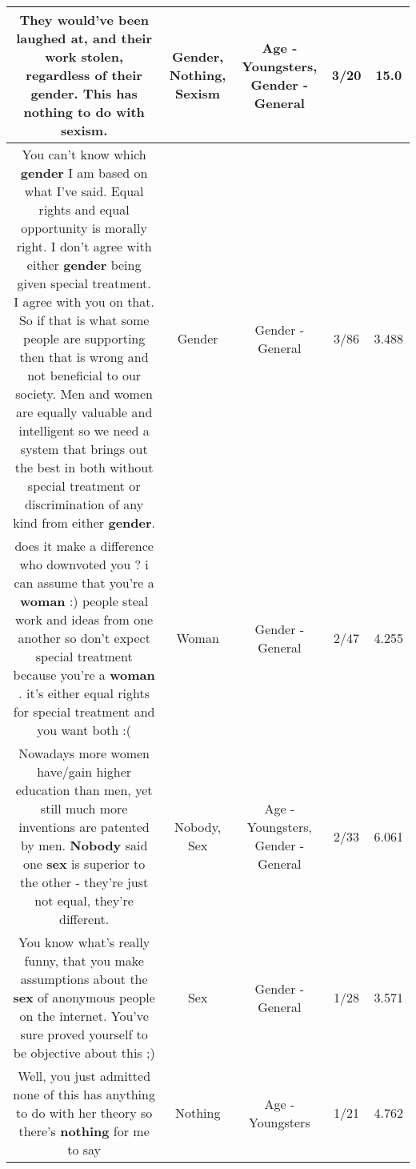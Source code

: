 \documentclass[11pt]{article}
\newlength\mylength
\begin{document}
\begin{center}
\begin{longtable}{|C{.65\mylength}|C{.30\mylength}|C{.12\mylength}|C{.12\mylength}|C{.12\mylength}|}
  \small They would've been laughed at, and their work stolen, regardless of their \textbf{gender}. This has \textbf{nothing} to do with \textbf{sexism}.\normalsize   & Gender, Nothing, Sexism & Age - Youngsters, Gender - General & 3/20 & 15.0 \\  \hline
  \small You can't know which \textbf{gender} I am based on what I've said. Equal rights and equal opportunity is morally right. I don't agree with either \textbf{gender} being given special treatment. I agree with you on that. So if that is what some people are supporting then that is wrong and not beneficial to our society. Men and women are equally valuable and intelligent so we need a system that brings out the best in both without special treatment or discrimination of any kind from either \textbf{gender}.\normalsize   & Gender & Gender - General & 3/86 & 3.488 \\  \hline
  \small does it make a difference who downvoted you ? i can assume that you're a \textbf{woman} :) people steal work and ideas from one another so don't expect special treatment because you're a \textbf{woman} . it's either equal rights for special treatment and you want both :(\normalsize   & Woman & Gender - General & 2/47 & 4.255 \\  \hline
  \small Nowadays more women have/gain higher education than men, yet still much more inventions are patented by men. \textbf{Nobody} said one \textbf{sex} is superior to the other - they're just not equal, they're different.\normalsize   & Nobody, Sex & Age - Youngsters, Gender - General & 2/33 & 6.061 \\  \hline
  \small You know what's really funny, that you make assumptions about the \textbf{sex} of anonymous people on the internet. You've sure proved yourself to be objective about this ;)\normalsize   & Sex & Gender - General & 1/28 & 3.571 \\  \hline
  \small Well, you just admitted none of this has anything to do with her theory so there's \textbf{nothing} for me to say\normalsize   & Nothing & Age - Youngsters & 1/21 & 4.762 \\  \hline

\end{longtable}
\end{center}
\end{document}
